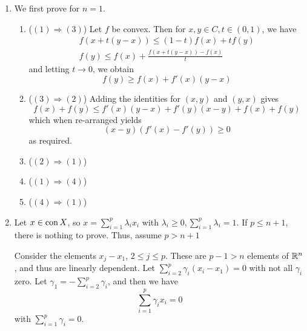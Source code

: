 \begin{enumerate}[label*=Ex \arabic*.]
\item \label{item:7}
  We first prove for $n = 1$.
  \begin{enumerate}
  \item ($(1) \Rightarrow (3)$)  Let $f$ be convex.  Then for $x, y
    \in C, t \in (0, 1)$, we have
    \begin{align}
      \label{eq:23}
      f(x + t(y-x)) \leq (1-t) f(x) + t f(y) \\
      f(y) \leq f(x) + \frac{f(x + t(y-x)) - f(x)}{t}
    \end{align} and letting $t \rightarrow 0$, we obtain
    \begin{equation}
      \label{eq:24}
      f(y) \geq f(x) + f'(x) (y - x)
    \end{equation}
  \item ($(3) \Rightarrow (2)$) Adding the identities for $(x, y)$ and
    $(y, x)$ gives
    \begin{equation}
      \label{eq:25}
      f(x) + f(y) \leq f'(x)(y - x) + f'(y)(x-y) + f(x) + f(y)
    \end{equation} which when re-arranged yields
    \begin{equation}
      \label{eq:26}
      (x-y)(f'(x) - f'(y)) \geq 0
    \end{equation} as required.
  \item ($(2) \Rightarrow (1)$) 
  \item ($(1) \Rightarrow (4)$) 
  \item ($(4) \Rightarrow (1)$) 
  \end{enumerate}
\item \label{item:8}
  Let $x \in \operatorname*{con} X$, so $x = \sum_{i=1}^{p} \lambda_{i} x_{i}$ with
  $\lambda_{i} \geq 0, \sum_{i=1}^{p} \lambda_{i} = 1$. If $p \leq n +
  1$, there is nothing to prove.  Thus, assume $p > n + 1$

  Consider the elements $x_{j} - x_{1}$, $2 \leq j \leq p$.  These are
  $p - 1 > n$ elements of $\mathbb{R}^{n}$, and thus are linearly dependent.
  Let $\sum_{i=2}^{p} \gamma_{i} (x_{i} - x_{1}) = 0$ with not all
  $\gamma_{i}$ zero.  Let $\gamma_{1} = - \sum_{i=2}^{p} \gamma_{i}$,
  and then we have
  \begin{equation}
    \label{eq:27}
    \sum_{i=1}^{p} \gamma_{i} x_{i} = 0
  \end{equation} with $\sum_{i=1}^{p} \gamma_{i} = 0$.


\end{enumerate}
